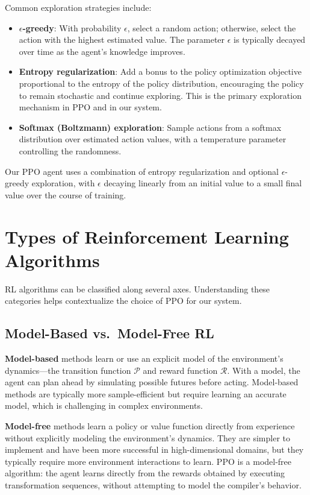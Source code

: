 Common exploration strategies include:

\begin{itemize}
    \item \textbf{$\epsilon$-greedy}: With probability $\epsilon$, select a random action; otherwise, select the action with the highest estimated value. The parameter $\epsilon$ is typically decayed over time as the agent's knowledge improves.
    \item \textbf{Entropy regularization}: Add a bonus to the policy optimization objective proportional to the entropy of the policy distribution, encouraging the policy to remain stochastic and continue exploring. This is the primary exploration mechanism in PPO and in our system.
    \item \textbf{Softmax (Boltzmann) exploration}: Sample actions from a softmax distribution over estimated action values, with a temperature parameter controlling the randomness.
\end{itemize}

Our PPO agent uses a combination of entropy regularization and optional $\epsilon$-greedy exploration, with $\epsilon$ decaying linearly from an initial value to a small final value over the course of training.

\section{Types of Reinforcement Learning Algorithms}

RL algorithms can be classified along several axes. Understanding these categories helps contextualize the choice of PPO for our system.

\subsection{Model-Based vs.\ Model-Free RL}

\textbf{Model-based} methods learn or use an explicit model of the environment's dynamics—the transition function $\mathcal{P}$ and reward function $\mathcal{R}$. With a model, the agent can plan ahead by simulating possible futures before acting. Model-based methods are typically more sample-efficient but require learning an accurate model, which is challenging in complex environments.

\textbf{Model-free} methods learn a policy or value function directly from experience without explicitly modeling the environment's dynamics. They are simpler to implement and have been more successful in high-dimensional domains, but they typically require more environment interactions to learn. PPO is a model-free algorithm: the agent learns directly from the rewards obtained by executing transformation sequences, without attempting to model the compiler's behavior.

